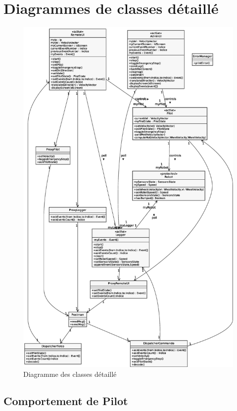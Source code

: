 \section{Diagrammes de classes détaillé}

\begin{figure}[H] 
    \centering
    \includegraphics[width=\linewidth]{img/diagrammeClasses.eps}
    \caption{Diagramme des classes détaillé}
\end{figure}

\subsection{Comportement de Pilot}

